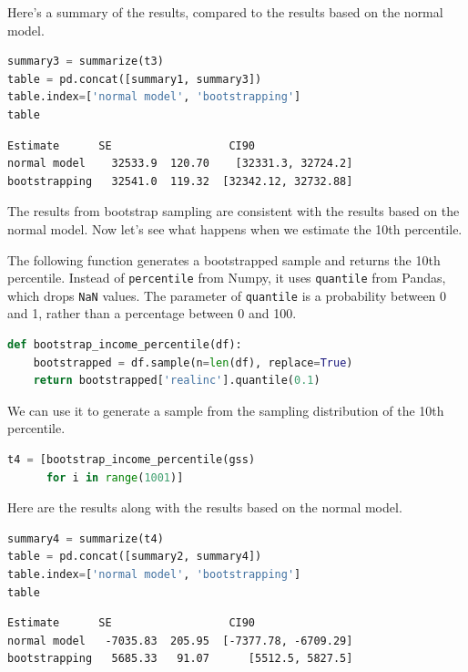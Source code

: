 Here's a summary of the results, compared to the results based on the
normal model.

\begin{lstlisting}[language=Python,style=source]
summary3 = summarize(t3)
table = pd.concat([summary1, summary3])
table.index=['normal model', 'bootstrapping']
table
\end{lstlisting}

\begin{lstlisting}[style=output]
               Estimate      SE                  CI90
normal model    32533.9  120.70    [32331.3, 32724.2]
bootstrapping   32541.0  119.32  [32342.12, 32732.88]
\end{lstlisting}

The results from bootstrap sampling are consistent with the results
based on the normal model. Now let's see what happens when we estimate
the 10th percentile.

The following function generates a bootstrapped sample and returns the
10th percentile. Instead of \passthrough{\lstinline!percentile!} from
Numpy, it uses \passthrough{\lstinline!quantile!} from Pandas, which
drops \passthrough{\lstinline!NaN!} values. The parameter of
\passthrough{\lstinline!quantile!} is a probability between 0 and 1,
rather than a percentage between 0 and 100.

\begin{lstlisting}[language=Python,style=source]
def bootstrap_income_percentile(df):
    bootstrapped = df.sample(n=len(df), replace=True)
    return bootstrapped['realinc'].quantile(0.1)
\end{lstlisting}

We can use it to generate a sample from the sampling distribution of the
10th percentile.

\begin{lstlisting}[language=Python,style=source]
t4 = [bootstrap_income_percentile(gss)
      for i in range(1001)]
\end{lstlisting}

Here are the results along with the results based on the normal model.

\begin{lstlisting}[language=Python,style=source]
summary4 = summarize(t4)
table = pd.concat([summary2, summary4])
table.index=['normal model', 'bootstrapping']
table
\end{lstlisting}

\begin{lstlisting}[style=output]
               Estimate      SE                  CI90
normal model   -7035.83  205.95  [-7377.78, -6709.29]
bootstrapping   5685.33   91.07      [5512.5, 5827.5]
\end{lstlisting}

